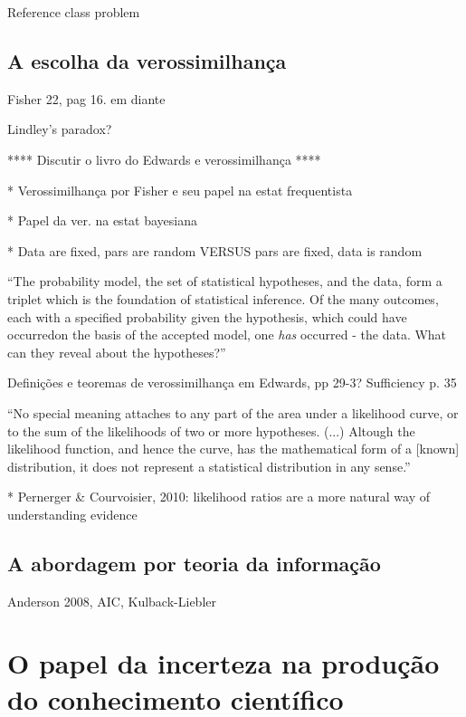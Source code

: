 \documentclass[12pt,a4paper]{article}
\begin{document}
Reference class problem

\subsection{A escolha da verossimilhança}
Fisher 22, pag 16. em diante

Lindley's paradox?

**** Discutir o livro do Edwards e verossimilhança ****

* Verossimilhança por Fisher e seu papel na estat frequentista

* Papel da ver. na estat bayesiana

* Data are fixed, pars are random VERSUS pars are fixed, data is random

``The probability model, the set of statistical hypotheses, and the data, form a triplet which is the foundation of
statistical inference. Of the many outcomes, each with a specified probability given the hypothesis, which could have
occurredon the basis of the accepted model, one {\em has} occurred - the data. What can they reveal about the hypotheses?''
\cite{Edwards72}


Definições e teoremas de verossimilhança em Edwards, pp 29-3?
Sufficiency p. 35

``No special meaning attaches to any part of the area under a likelihood curve, or to the sum of the likelihoods of two or more
hypotheses.
(...)
Altough the likelihood function, and hence the curve, has the mathematical form of a [known] distribution, it does not
represent a statistical distribution in any sense.''\cite{Edwards72}

* Pernerger \& Courvoisier, 2010: likelihood ratios are a more natural way of understanding evidence

\subsection{A abordagem por teoria da informação}

Anderson 2008, AIC, Kulback-Liebler

\section{O papel da incerteza na produção do conhecimento científico}
\end{document}
